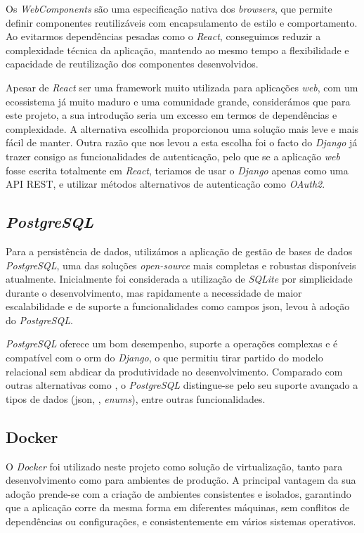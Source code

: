 Os \textit{WebComponents} \cite{webcomponents} são uma especificação nativa dos \textit{browsers}, que permite definir componentes reutilizáveis com encapsulamento de estilo e comportamento. Ao evitarmos dependências pesadas como o \textit{React}, conseguimos reduzir a complexidade técnica da aplicação, mantendo ao mesmo tempo a flexibilidade e capacidade de reutilização dos componentes desenvolvidos.

Apesar de \textit{React} ser uma framework muito utilizada para aplicações \textit{web},  com um ecossistema já muito maduro e uma comunidade grande, considerámos que para este projeto, a sua introdução seria um excesso em termos de dependências e complexidade. A alternativa escolhida proporcionou uma solução mais leve e mais fácil de manter. Outra razão que nos levou a esta escolha foi o facto do \textit{Django} já trazer consigo as funcionalidades de autenticação, pelo que se a aplicação \textit{web} fosse escrita totalmente em \textit{React}, teriamos de usar o \textit{Django} apenas como uma \gls{API} \gls{REST}, e utilizar métodos alternativos de autenticação como \textit{OAuth2}.

\subsection{\textit{PostgreSQL}}

Para a persistência de dados, utilizámos a aplicação de gestão de bases de dados \textit{PostgreSQL}, uma das soluções \textit{open-source} mais completas e robustas disponíveis atualmente. Inicialmente foi considerada a utilização de \textit{SQLite} por simplicidade durante o desenvolvimento, mas rapidamente a necessidade de maior escalabilidade e de suporte a funcionalidades como campos \gls{json}, levou à adoção do \textit{PostgreSQL}.

\textit{PostgreSQL} oferece um bom desempenho, suporte a operações complexas e é compatível com o \gls{orm} do \textit{Django}, o que permitiu tirar partido do modelo relacional sem abdicar da produtividade no desenvolvimento. Comparado com outras alternativas como , o \textit{PostgreSQL} distingue-se pelo seu suporte avançado a tipos de dados (\gls{json}, , \textit{enums}), entre outras funcionalidades.


\subsection{Docker}

O \textit{Docker} foi utilizado neste projeto como solução de virtualização, tanto para desenvolvimento como para ambientes de produção. A principal vantagem da sua adoção prende-se com a criação de ambientes consistentes e isolados, garantindo que a aplicação corre da mesma forma em diferentes máquinas, sem conflitos de dependências ou configurações, e consistentemente em vários sistemas operativos. 

